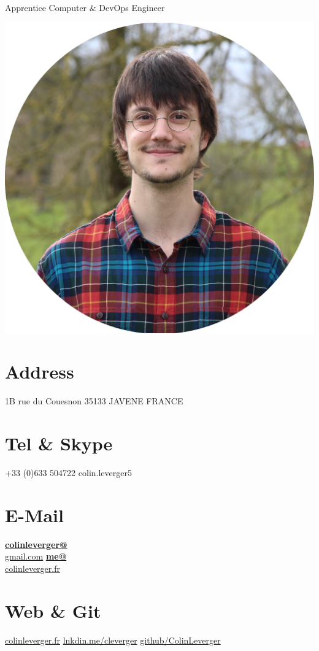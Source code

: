 \documentclass[]{friggeri-cv}
\begin{document}
      {Apprentice Computer \& DevOps Engineer}


\begin{aside}
  \includegraphics[scale=0.145]{img/rounded.png}
  \section{Address}
    1B rue du Couesnon
    35133 JAVENE
    FRANCE
    ~
  \section{Tel \& Skype}
    +33 (0)633 504722
    colin.leverger5
    ~
  \section{E-Mail}
    \href{mailto:colinleverger@gmail.com}{\textbf{colinleverger@}\\gmail.com}
    \href{mailto:me@colinleverger.fr}{\textbf{me@}\\colinleverger.fr}
    ~
  \section{Web \& Git}
    \href{http://www.colinleverger.fr}{colinleverger.fr}
    \href{https://www.linkedin.com/in/colinleverger}{lnkdin.me/cleverger}
    \href{https://github.com/ColinLeverger}{github/ColinLeverger}
    ~

\end{aside}
\end{document}

